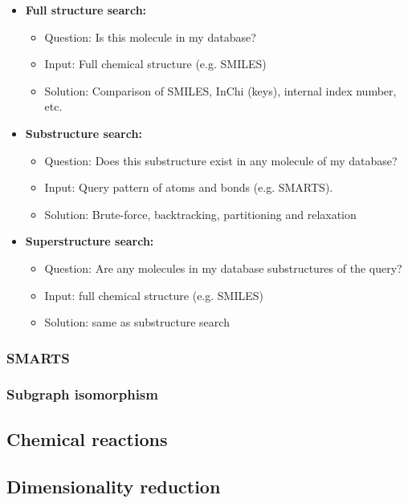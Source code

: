 \begin{itemize}
    \item \textbf{Full structure search:}
    \begin{itemize}
        \item Question: Is this molecule in my database?
        \item Input: Full chemical structure (e.g. SMILES)
        \item Solution: Comparison of SMILES, InChi (keys), internal index number, etc.
    \end{itemize}
    \item \textbf{Substructure search:}
    \begin{itemize}
        \item Question: Does this substructure exist in any molecule of my database?
        \item Input: Query pattern of atoms and bonds (e.g. SMARTS).
        \item Solution: Brute-force, backtracking, partitioning and relaxation
    \end{itemize}
    \item \textbf{Superstructure search:}
    \begin{itemize}
        \item Question: Are any molecules in my database substructures of the query?
        \item Input: full chemical structure (e.g. SMILES)
        \item Solution: same as substructure search
    \end{itemize}
\end{itemize}

\subsubsection{SMARTS}

\subsubsection{Subgraph isomorphism}

\subsection{Chemical reactions}

\subsection{Dimensionality reduction}


